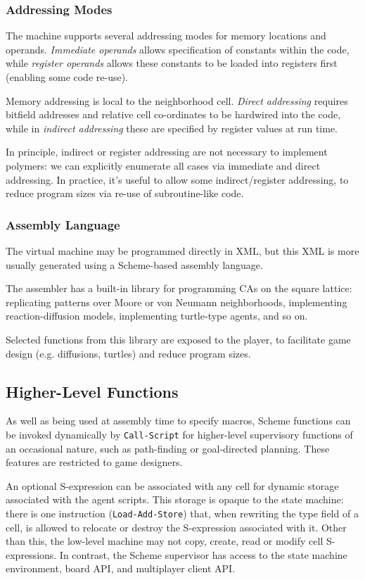 \documentclass{acm_proc_article-sp}
\begin{document}
\subsubsection{Addressing Modes}

The machine supports several addressing modes for memory locations and operands.
{\em Immediate operands} allows specification of constants within the code,
while {\em register operands} allows these constants to be loaded into registers first (enabling some code re-use).

Memory addressing is local to the neighborhood cell.
{\em Direct addressing} requires bitfield addresses and relative cell co-ordinates to be hardwired into the code,
while in {\em indirect addressing} these are specified by register values at run time.

In principle, indirect or register addressing are not necessary to implement polymers:
we can explicitly enumerate all cases via immediate and direct addressing.
In practice, it's useful to allow some indirect/register addressing,
to reduce program sizes via re-use of subroutine-like code.

\subsubsection{Assembly Language}

The virtual machine may be programmed directly in XML, but this XML is more usually generated using
a Scheme-based assembly language.

The assembler has a built-in library for programming CAs on the square lattice:
replicating patterns over Moore or von Neumann neighborhoods,
implementing reaction-diffusion models, implementing turtle-type agents, and so on.

Selected functions from this library are exposed to the player,
to facilitate game design (e.g. diffusions, turtles) and reduce program sizes.

\subsection{Higher-Level Functions}

As well as being used at assembly time to specify macros,
Scheme functions can be invoked dynamically by {\tt Call-Script}
for higher-level supervisory functions of an occasional nature,
such as path-finding or goal-directed planning.
These features are restricted to game designers.

An optional S-expression can be associated with any cell for dynamic storage associated with the agent scripts.
This storage is opaque to the state machine: there is one instruction ({\tt Load-Add-Store}) that, when rewriting the type field of a cell, is allowed to relocate or destroy the S-expression associated with it.
Other than this, the low-level machine may not copy, create, read or modify cell S-expressions.
In contrast, the Scheme supervisor has access to the state machine environment, board API, and multiplayer client API.
\end{document}
